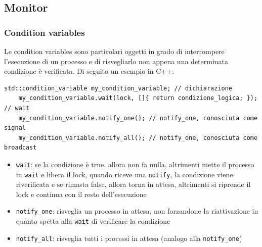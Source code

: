 \documentclass[a4paper]{article}
\begin{document}

\subsection{Monitor}
\subsubsection*{Condition variables}
Le condition variables sono particolari oggetti in grado di interrompere l'esecuzione di un processo e di risvegliarlo non appena
una determinata condizione è verificata. Di seguito un esempio in C++:

\begin{lstlisting}[numbers=none]
	std::condition_variable my_condition_variable; // dichiarazione
	my_condition_variable.wait(lock, []{ return condizione_logica; }); // wait
	my_condition_variable.notify_one(); // notify_one, conosciuta come signal
	my_condition_variable.notify_all(); // notify_one, conosciuta come broadcast
\end{lstlisting}
\begin{itemize}
	\item \verb|wait|: se la condizione è true, allora non fa nulla, altrimenti mette il processo in \verb|wait| e libera il lock,
	quando riceve una \verb|notify|, la condizione viene riverificata e se rimasta false, allora torna in attesa, altrimenti si
	riprende il lock e continua con il resto dell'esecuzione
	\item \verb|notify_one|: risveglia un processo in attesa, non forzandone la riattivazione in quanto spetta alla \verb|wait| di
	verificare la condizione
	\item \verb|notify_all|: risveglia tutti i processi in attesa (analogo alla \verb|notify_one|)
\end{itemize}
\end{document}
